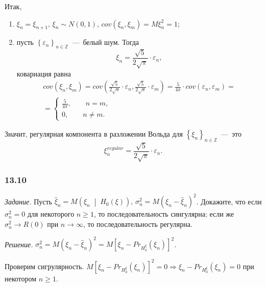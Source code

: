 Итак,
\begin{enumerate}
  \item $ \xi_n = \xi_{n + 1}, \,
    \xi_n \sim N \left( 0, 1 \right), \,
    cov \left( \xi_n, \xi_m \right) = M \xi_n^2 = 1$;
  \item пусть $ \left\{ \varepsilon_n \right\}_{n \in \mathbb{Z}}$~---~белый шум.
  Тогда
  \begin{equation*}
    \xi_n = \frac{ \sqrt{5}}{2 \sqrt{ \pi }} \cdot \varepsilon_n,
  \end{equation*}
  ковариация равна
  \begin{gather*}
    cov \left( \xi_n, \xi_m \right) =
    cov \left(
      \frac{ \sqrt{5}}{2 \sqrt{ \pi }} \cdot \varepsilon_n,
      \frac{ \sqrt{5}}{2 \sqrt{ \pi }} \cdot \varepsilon_m
    \right) =
    \frac{5}{4 \pi } \cdot cov \left( \varepsilon_n, \varepsilon_m \right) = \\
    = \begin{cases}
      \frac{5}{4 \pi }, \qquad n = m, \\
      0, \qquad n \neq m.
    \end{cases}
  \end{gather*}
\end{enumerate}

Значит,
регулярная компонента в разложении Вольда для $ \left\{ \xi_n \right\}_{n \in \mathbb{Z}}$~---~это
\begin{equation*}
  \xi_n^{regular} =
  \frac{ \sqrt{5}}{2 \sqrt{ \pi }} \cdot \varepsilon_n.
\end{equation*}

\subsubsection*{13.10}

\textit{Задание.}
Пусть
$ \hat{ \xi }_n = M \left( \xi_n \; \middle| \; H_0 \left( \xi \right) \right), \,
  \sigma_n^2 = M \left( \xi_n - \hat{ \xi }_n \right)^2$.
Докажите, что если $ \sigma_n^2 = 0$ для некоторого $n \geq 1$, то последовательность сингулярна;
если же $ \sigma_n^2 \to R \left( 0 \right) $ при $n \to \infty $, то последовательность регулярна.

\textit{Решение.}
$ \sigma_n^2 =
  M \left( \xi_n - \hat{ \xi }_n \right)^2 =
  M \left[ \xi_n - Pr_{H_0^{ \xi }} \left( \xi_n \right) \right]^2$.

Проверим сигрулярность.
$M \left[ \xi_n - Pr_{H_0^{ \xi }} \left( \xi_n \right) \right]^2 = 0 \Rightarrow
  \xi_n - Pr_{H_0^{ \xi }} \left( \xi_n \right) = 0$
при некотором $n \geq 1$.

